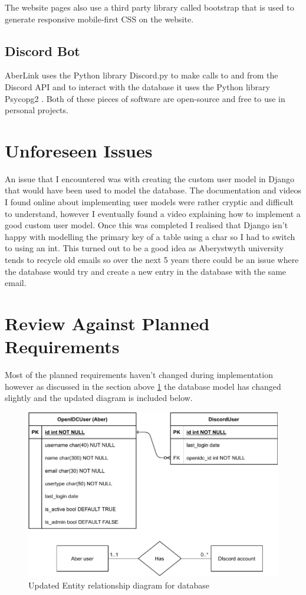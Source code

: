 The website pages also use a third party library called bootstrap \cite{bootstrap} that is used to generate responsive mobile-first CSS on the website.

\subsection{Discord Bot}
AberLink uses the Python library Discord.py \cite{discord.py} to make calls to and from the Discord API and to interact with the database it uses the Python library Psycopg2 \cite{psycopg2}. Both of these pieces of software are open-source and free to use in personal projects.

\section{Unforeseen Issues}\label{sec3:unforeseen}
An issue that I encountered was with creating the custom user model in Django that would have been used to model the database. The documentation and videos I found online about implementing user models were rather cryptic and difficult to understand, however I eventually found a video explaining how to implement a good custom user model. Once this was completed I realised that Django isn't happy with modelling the primary key of a table using a char so I had to switch to using an int. This turned out to be a good idea as Aberystwyth university tends to recycle old emails so over the next 5 years there could be an issue where the database would try and create a new entry in the database with the same email.

\section{Review Against Planned Requirements}
Most of the planned requirements haven't changed during implementation however as discussed in the section above \ref{sec3:unforeseen} the database model has changed slightly and the updated diagram is included below.
\begin{figure}[H]
	\centering
	\includegraphics[width=0.8\linewidth]{Figures/database-er-1}
	\caption{Updated Entity relationship diagram for database}
	\label{fig:database-er-1}
\end{figure}

